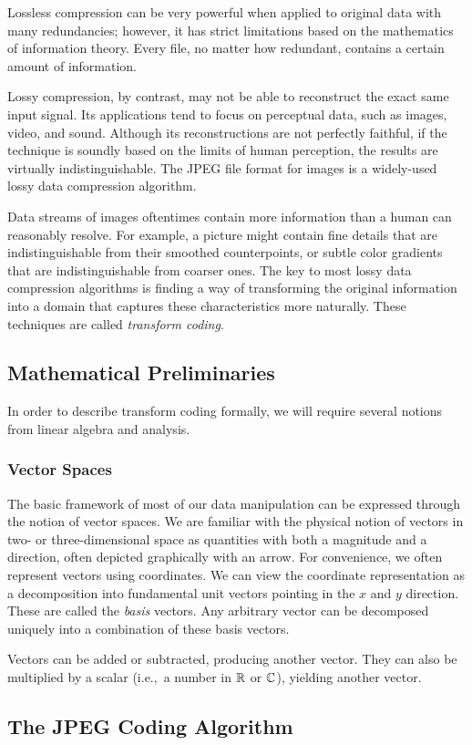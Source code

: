 Lossless compression can be very powerful when applied to original data with many redundancies; however, it has strict limitations based on the mathematics of information theory. Every file, no matter how redundant, contains a certain amount of information. 

Lossy compression, by contrast, may not be able to reconstruct the exact same input signal. Its applications tend to focus on perceptual data, such as images, video, and sound. Although its reconstructions are not perfectly faithful, if the technique is soundly based on the limits of human perception, the results are virtually indistinguishable. The JPEG file format for images is a widely-used lossy data compression algorithm.

Data streams of images oftentimes contain more information than a human can reasonably resolve. For example, a picture might contain fine details that are indistinguishable from their smoothed counterpoints, or subtle color gradients that are indistinguishable from coarser ones. The key to most lossy data compression algorithms is finding a way of transforming the original information into a domain that captures these characteristics more naturally. These techniques are called {\em transform coding}.

\subsection{Mathematical Preliminaries}
In order to describe transform coding formally, we will require several notions from linear algebra and analysis.
\subsubsection{Vector Spaces}
The basic framework of most of our data manipulation can be expressed through the notion of vector spaces. We are familiar with the physical notion of vectors in two- or three-dimensional space as quantities with both a magnitude and a direction, often depicted graphically with an arrow.  For convenience, we often represent vectors using coordinates. We can view the coordinate representation as a decomposition into fundamental unit vectors pointing in the $x$ and $y$ direction. These are called the {\em basis} vectors. Any arbitrary vector can be decomposed uniquely into a combination of these basis vectors. 

Vectors can be added or subtracted, producing another vector. They can also be multiplied by a scalar (i.e.,~a number in $\mathbb{R}$ or $\mathbb{C}$), yielding another vector.
\subsection{The JPEG Coding Algorithm}